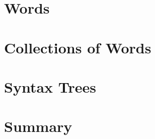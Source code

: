 \documentclass{article}
\begin{document}
\section{Words}
\label{sec:words}

\section{Collections of Words}
\label{sec:collections}

\section{Syntax Trees}
\label{sec:trees}

\section{Summary}
\label{sec:summary}
\end{document}

